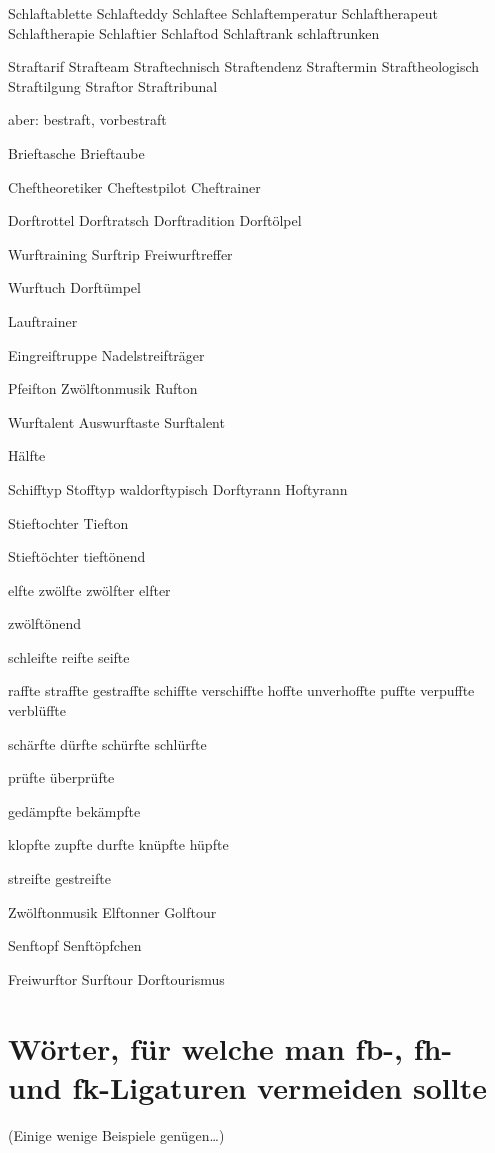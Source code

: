 Schlaftablette Schlafteddy Schlaftee Schlaftemperatur 
Schlaftherapeut Schlaftherapie Schlaftier Schlaftod 
Schlaftrank schlaftrunken

Straftarif Strafteam Straftechnisch Straftendenz
Straftermin Straftheologisch Straftilgung 
Straftor Straftribunal

aber: bestraft, vorbestraft

Brieftasche Brieftaube

Cheftheoretiker Cheftestpilot Cheftrainer

Dorftrottel Dorftratsch Dorftradition Dorftölpel

Wurftraining Surftrip Freiwurftreffer

Wurftuch Dorftümpel

Lauftrainer

Eingreiftruppe Nadelstreifträger

Pfeifton Zwölftonmusik Rufton

Wurftalent Auswurftaste Surftalent

Hälfte 

Schifftyp Stofftyp waldorftypisch Dorftyrann Hoftyrann 

Stieftochter Tiefton

Stieftöchter tieftönend

elfte zwölfte zwölfter elfter

zwölftönend

schleifte reifte seifte

raffte straffte gestraffte schiffte verschiffte
hoffte unverhoffte
puffte verpuffte
verblüffte

schärfte 
dürfte schürfte schlürfte

prüfte überprüfte

gedämpfte bekämpfte 



klopfte zupfte durfte knüpfte hüpfte

streifte gestreifte

Zwölftonmusik Elftonner Golftour

Senftopf Senftöpfchen

Freiwurftor Surftour Dorftourismus


\section*{Wörter, für welche man \mbox{fb}-, \mbox{fh}- und \mbox{fk}-Ligaturen vermeiden sollte}

(Einige wenige Beispiele genügen\ldots)

